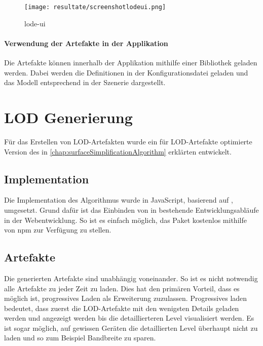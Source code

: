 \begin{figure}[H]
  \centering
  \texttt{[image: resultate/screenshotlodeui.png]}
  \caption{lode-ui}
  \label{fig:lodeui}
\end{figure}

\paragraph{Verwendung der Artefakte in der Applikation}
Die Artefakte können innerhalb der Applikation mithilfe einer Bibliothek geladen werden. Dabei werden die Definitionen in der Konfigurationsdatei geladen und das Modell entsprechend in der Szenerie dargestellt.

\section{LOD Generierung}

Für das Erstellen von LOD-Artefakten wurde ein für LOD-Artefakte optimierte Version des in \autoref{chap:surfaceSimplificationAlgorithm} erklärten  entwickelt.

\subsection{Implementation}

Die Implementation des Algorithmus wurde in JavaScript, basierend auf , umgesetzt. Grund dafür ist das Einbinden von  in bestehende Entwicklungsabläufe in der Webentwicklung. So ist es einfach möglich, das Paket kostenlos mithilfe von \gls{npm} zur Verfügung zu stellen.

\subsection{Artefakte}

Die generierten Artefakte sind unabhängig voneinander. So ist es nicht notwendig alle Artefakte zu jeder Zeit zu laden. Dies hat den primären Vorteil, dass es möglich ist, progressives Laden als Erweiterung zuzulassen. Progressives laden bedeutet, dass zuerst die LOD-Artefakte mit den wenigsten Details geladen werden und angezeigt werden bis die detaillierteren Level visualisiert werden.
Es ist sogar möglich, auf gewissen Geräten die detaillierten Level überhaupt nicht zu laden und so zum Beispiel Bandbreite zu sparen.

